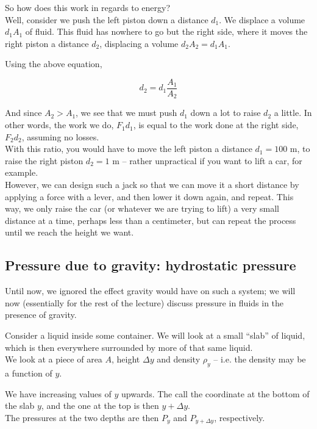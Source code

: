 So how does this work in regards to energy?\\
Well, consider we push the left piston down a distance $d_1$. We displace a volume $d_1 A_1$ of fluid. This fluid has nowhere to go but the right side, where it moves the right piston a distance $d_2$, displacing a volume $d_2 A_2 = d_1 A_1$.

Using the above equation,

\begin{equation}
d_2 = d_1 \frac{A_1}{A_2}
\end{equation}

And since $A_2 > A_1$, we see that we must push $d_1$ down a lot to raise $d_2$ a little. In other words, the work we do, $F_1 d_1$, is equal to the work done at the right side, $F_2 d_2$, assuming no losses.\\
With this ratio, you would have to move the left piston a distance $d_1 = 100$ m, to raise the right piston $d_2 = 1$ m -- rather unpractical if you want to lift a car, for example.\\
However, we can design such a jack so that we can move it a short distance by applying a force with a lever, and then lower it down again, and repeat. This way, we only raise the car (or whatever we are trying to lift) a very small distance at a time, perhaps less than a centimeter, but can repeat the process until we reach the height we want.

\subsection{Pressure due to gravity: hydrostatic pressure}

Until now, we ignored the effect gravity would have on such a system; we will now (essentially for the rest of the lecture) discuss pressure in fluids in the presence of gravity.

Consider a liquid inside some container. We will look at a small ``slab'' of liquid, which is then everywhere surrounded by more of that same liquid.\\
We look at a piece of area $A$, height $\Delta y$ and density $\rho_y$ -- i.e. the density may be a function of $y$.

We have increasing values of $y$ upwards. The call the coordinate at the bottom of the slab $y$, and the one at the top is then $y + \Delta y$.\\
The pressures at the two depths are then $P_y$ and $P_{y + \Delta y}$, respectively.

